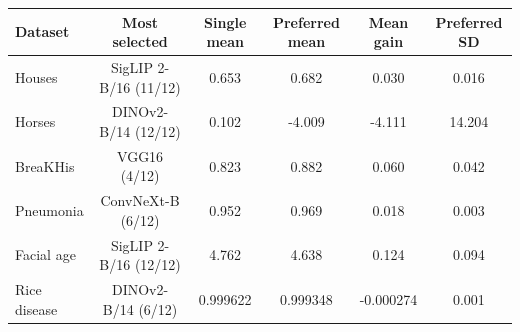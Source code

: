 \begin{tabular}{lccccc}
\toprule
Dataset & Most selected & Single mean & Preferred mean & Mean gain & Preferred SD\\
\midrule
Houses & SigLIP 2-B/16 (11/12) & 0.653 & 0.682 & 0.030 & 0.016\\
Horses & DINOv2-B/14 (12/12) & 0.102 & -4.009 & -4.111 & 14.204\\
BreaKHis & VGG16 (4/12) & 0.823 & 0.882 & 0.060 & 0.042\\
Pneumonia & ConvNeXt-B (6/12) & 0.952 & 0.969 & 0.018 & 0.003\\
Facial age & SigLIP 2-B/16 (12/12) & 4.762 & 4.638 & 0.124 & 0.094\\
Rice disease & DINOv2-B/14 (6/12) & 0.999622 & 0.999348 & -0.000274 & 0.001\\
\bottomrule
\end{tabular}
